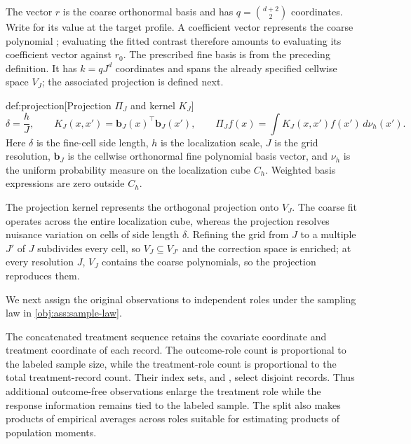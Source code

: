 \documentclass[11pt]{article}
\begin{document}
The vector \(r\) is the coarse orthonormal basis and has \(q=\binom{d+2}{2}\) coordinates. Write  for its value at the target profile. A coefficient vector  represents the coarse polynomial ; evaluating the fitted contrast therefore amounts to evaluating its coefficient vector against \(r_0\). The prescribed fine basis is  from the preceding definition. It has \(k=qJ^d\) coordinates and spans the already specified cellwise space \(V_J\); the associated projection is defined next.

\begin{definitionv}{def:projection}[Projection \(\Pi_J\) and kernel \(K_J\)]
\[
\delta=\frac hJ,\qquad
K_J(x,x')=\mathbf b_J(x)^\top \mathbf b_J(x'),\qquad
\Pi_Jf(x)=\int K_J(x,x')f(x')\,d\nu_h(x').
\]
Here \(\delta\) is the fine-cell side length, \(h\) is the localization scale, \(J\) is the grid resolution, \(\mathbf b_J\) is the cellwise orthonormal fine polynomial basis vector, and \(\nu_h\) is the uniform probability measure on the localization cube \(C_h\). Weighted basis expressions are zero outside \(C_h\).
\end{definitionv}

The projection kernel  represents the orthogonal projection  onto \(V_J\). The coarse fit operates across the entire localization cube, whereas the projection resolves nuisance variation on cells of side length \(\delta\). Refining the grid from \(J\) to a multiple \(J'\) of \(J\) subdivides every cell, so \(V_J\subseteq V_{J'}\) and the correction space is enriched; at every resolution \(J\), \(V_J\) contains the coarse polynomials, so the projection reproduces them.

We next assign the original observations to independent roles under the sampling law in \cref{obj:ass:sample-law}.

The concatenated treatment sequence  retains the covariate coordinate  and treatment coordinate  of each record. The outcome-role count  is proportional to the labeled sample size, while the treatment-role count  is proportional to the total treatment-record count. Their index sets,  and , select disjoint records. Thus additional outcome-free observations enlarge the treatment role while the response information remains tied to the labeled sample. The split also makes products of empirical averages across roles suitable for estimating products of population moments.
\end{document}
